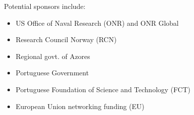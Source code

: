 Potential sponsors include:

\begin{itemize}[noitemsep,topsep=0pt,parsep=0pt,partopsep=0pt]

  \item US Office of Naval Research (ONR) and ONR Global
  \item Research Council Norway (RCN)
  \item Regional govt. of Azores
  \item Portuguese Government
  \item Portuguese Foundation of Science and Technology (FCT)
  \item European Union networking funding (EU)

\end{itemize}


